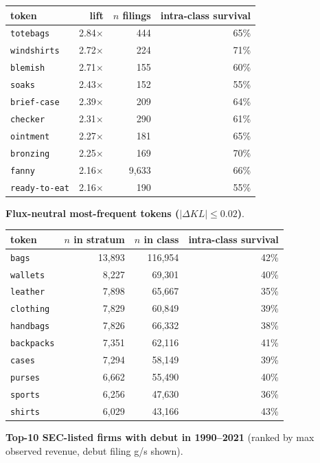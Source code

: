 \begin{tabular}{lrrr}
\toprule
token & lift & $n$ filings & intra-class survival \\
\midrule
\texttt{totebags} & 2.84$\times$ & 444 & 65\% \\
\texttt{windshirts} & 2.72$\times$ & 224 & 71\% \\
\texttt{blemish} & 2.71$\times$ & 155 & 60\% \\
\texttt{soaks} & 2.43$\times$ & 152 & 55\% \\
\texttt{brief-case} & 2.39$\times$ & 209 & 64\% \\
\texttt{checker} & 2.31$\times$ & 290 & 61\% \\
\texttt{ointment} & 2.27$\times$ & 181 & 65\% \\
\texttt{bronzing} & 2.25$\times$ & 169 & 70\% \\
\texttt{fanny} & 2.16$\times$ & 9,633 & 66\% \\
\texttt{ready-to-eat} & 2.16$\times$ & 190 & 55\% \\
\bottomrule
\end{tabular}

\textbf{Flux-neutral most-frequent tokens ($|\Delta KL|\leq 0.02$)}.

\begin{tabular}{lrrr}
\toprule
token & $n$ in stratum & $n$ in class & intra-class survival \\
\midrule
\texttt{bags} & 13,893 & 116,954 & 42\% \\
\texttt{wallets} & 8,227 & 69,301 & 40\% \\
\texttt{leather} & 7,898 & 65,667 & 35\% \\
\texttt{clothing} & 7,829 & 60,849 & 39\% \\
\texttt{handbags} & 7,826 & 66,332 & 38\% \\
\texttt{backpacks} & 7,351 & 62,116 & 41\% \\
\texttt{cases} & 7,294 & 58,149 & 39\% \\
\texttt{purses} & 6,662 & 55,490 & 40\% \\
\texttt{sports} & 6,256 & 47,630 & 36\% \\
\texttt{shirts} & 6,029 & 43,166 & 43\% \\
\bottomrule
\end{tabular}

\textbf{Top-10 SEC-listed firms with debut in 1990--2021} (ranked by max observed revenue, debut filing g/s shown).

